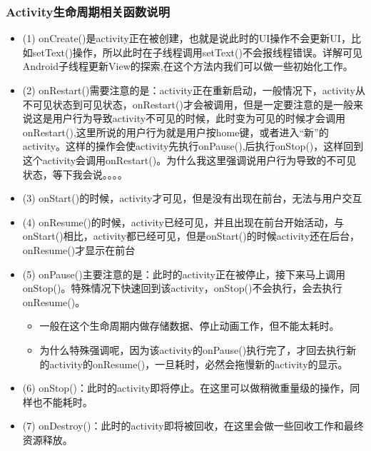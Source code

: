 \documentclass[9pt, b5paper]{article}
\begin{document}
\subsubsection{Activity生命周期相关函数说明}
\label{sec-1-1-1}
\begin{itemize}
\item (1) onCreate()是activity正在被创建，也就是说此时的UI操作不会更新UI，比如setText()操作，所以此时在子线程调用setText()不会报线程错误。详解可见Android子线程更新View的探索,在这个方法内我们可以做一些初始化工作。
\item (2) onRestart()需要注意的是：activity正在重新启动，一般情况下，activity从不可见状态到可见状态，onRestart()才会被调用，但是一定要注意的是一般来说这是用户行为导致activity不可见的时候，此时变为可见的时候才会调用onRestart(),这里所说的用户行为就是用户按home键，或者进入“新”的activity。这样的操作会使activity先执行onPause(),后执行onStop()，这样回到这个activity会调用onRestart()。为什么我这里强调说用户行为导致的不可见状态，等下我会说。。。。
\item (3) onStart()的时候，activity才可见，但是没有出现在前台，无法与用户交互
\item (4) onResume()的时候，activity已经可见，并且出现在前台开始活动，与onStart()相比，activity都已经可见，但是onStart()的时候activity还在后台，onResume()才显示在前台
\item (5) onPause()主要注意的是：此时的activity正在被停止，接下来马上调用onStop()。特殊情况下快速回到该activity，onStop()不会执行，会去执行onResume()。
\begin{itemize}
\item 一般在这个生命周期内做存储数据、停止动画工作，但不能太耗时。
\item 为什么特殊强调呢，因为该activity的onPause()执行完了，才回去执行新的activity的onResume()，一旦耗时，必然会拖慢新的activity的显示。
\end{itemize}
\item (6) onStop()：此时的activity即将停止。在这里可以做稍微重量级的操作，同样也不能耗时。
\item (7) onDestroy()：此时的activity即将被回收，在这里会做一些回收工作和最终资源释放。
\end{itemize}
\end{document}
